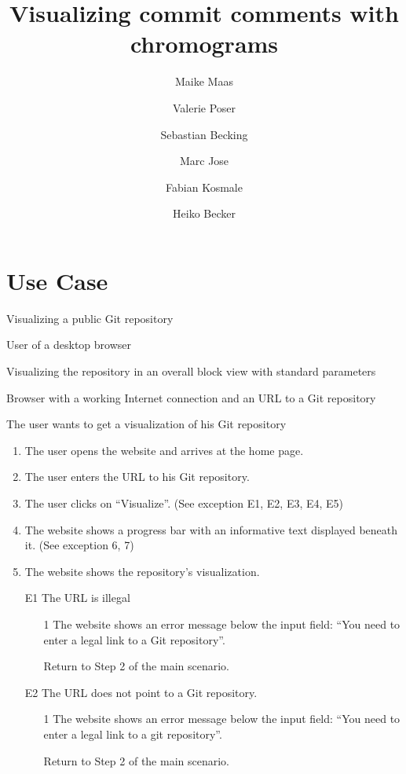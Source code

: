 \documentclass[11pt]{scrartcl}
\author{Maike Maas \and Valerie Poser \and Sebastian Becking \and
        Marc Jose \and Fabian Kosmale \and Heiko Becker}
\title{Visualizing commit comments with chromograms}
\begin{document}
\maketitle

\section{Use Case}
\begin{description}[leftmargin=!,labelwidth=\widthof{\bfseries Frequency of use:}]
	\item[Use-case:] Visualizing a public Git repository 
	\item[Primary actor:] User of a desktop browser 
	\item[Goal in context:] Visualizing the repository in an overall block view with standard parameters 
	\item[Preconditions:] Browser with a working Internet connection and an URL to a Git repository
	\item[Trigger:] The user wants to get a visualization of his Git repository 

	\item[Scenario:]
		\begin{enumerate}[leftmargin=1.5em]
			\item The user opens the website and arrives at the home page.
			\item The user enters the URL to his Git repository. 
			\item The user clicks on \enquote{Visualize}. (See exception E1, E2, E3, E4, E5)
			\item The website shows a progress bar with an
				informative text displayed beneath
				it. (See exception 6, 7)
			\item The website shows the repository's visualization.
		\end{enumerate}
	\item[Exception Flow:]
		\begin{enumerate}[leftmargin=1.5em]
			\item[E1] The URL is illegal
			\begin{enumerate}
				\item[1] The website shows an error message below the input field: \enquote{You need to enter a legal link to a Git 						repository}.
				\item[] Return to Step 2 of the main scenario.
			\end{enumerate}
			
			\item[E2] The URL does not point to a Git repository. 
				\begin{enumerate}
					\item[1] The website shows an error message below the input field: \enquote{You need to enter a legal 		
						link to a git repository}.
					\item[] Return to Step 2 of the main scenario.
				\end{enumerate}
				

\end{enumerate}
\end{description}
\end{document}
